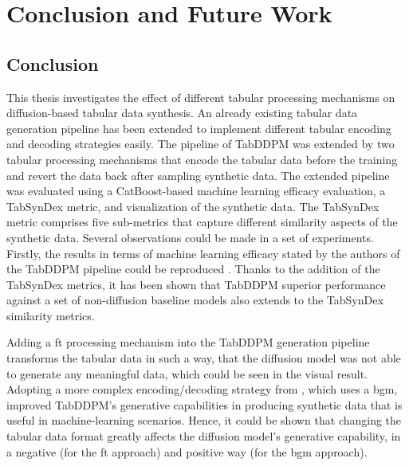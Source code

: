 \chapter{Conclusion and Future Work}
\label{ch:conclusion}

\section{Conclusion}
\label{ch:conclusion_}

This thesis investigates the effect of different tabular processing mechanisms on diffusion-based tabular data synthesis.
An already existing tabular data generation pipeline has been extended to implement different tabular encoding and decoding strategies easily.
The pipeline of TabDDPM \cite{kotelnikov2022TabDDPMModellingTabular} was extended by two tabular processing mechanisms that encode the tabular data before the training and revert the data back after sampling synthetic data.
The extended pipeline was evaluated using a CatBoost-based machine learning efficacy evaluation, a TabSynDex metric, and visualization of the synthetic data.
The TabSynDex metric comprises five sub-metrics that capture different similarity aspects of the synthetic data.
Several observations could be made in a set of experiments.
Firstly, the results in terms of machine learning efficacy stated by the authors of the TabDDPM pipeline could be reproduced \cite{kotelnikov2022TabDDPMModellingTabular}.
Thanks to the addition of the TabSynDex metrics, it has been shown that TabDDPM superior performance against a set of non-diffusion baseline models also extends to the TabSynDex similarity metrics.

Adding a \acrfull{ft} processing mechanism into the TabDDPM generation pipeline transforms the tabular data in such a way,
that the diffusion \gls{model} was not able to generate any meaningful data, which could be seen in the visual result.
Adopting a more complex encoding/decoding strategy from \cite{zhao2022CTABGANEnhancingTabular}, which uses a \acrfull{bgm},
improved TabDDPM's generative capabilities in producing synthetic data that is useful in machine-learning scenarios.
Hence, it could be shown that changing the tabular data format greatly affects the diffusion \gls{model}'s generative capability, in a negative (for the \gls{ft} approach) and positive way (for the \gls{bgm} approach).

